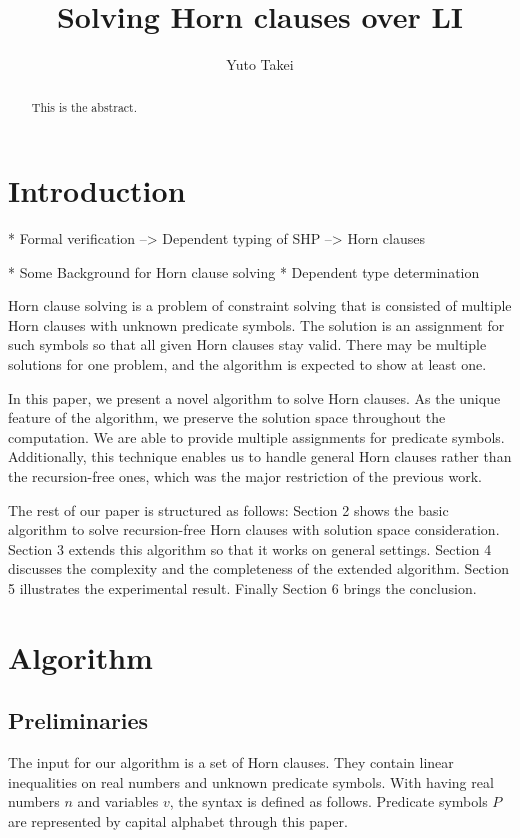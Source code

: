 \documentclass{llncs}
\title{Solving Horn clauses over LI}
\author{Yuto Takei}
\institute{The University of Tokyo}
\begin{document}
\maketitle
\begin{abstract}
  This is the abstract.
\end{abstract}

\section{Introduction}


* Formal verification
--> Dependent typing of SHP
--> Horn clauses

* Some
Background for Horn clause solving
* Dependent type determination

Horn clause solving is a problem of constraint solving that is consisted of multiple Horn clauses with unknown predicate symbols. The solution is an assignment for such symbols so that all given Horn clauses stay valid. There may be multiple solutions for one problem, and the algorithm is expected to show at least one.

In this paper, we present a novel algorithm to solve Horn clauses. As the unique feature of the algorithm, we preserve the solution space throughout the computation. We are able to provide multiple assignments for predicate symbols. Additionally, this technique enables us to handle general Horn clauses rather than the recursion-free ones, which was the major restriction of the previous work.

The rest of our paper is structured as follows: Section 2 shows the basic algorithm to solve recursion-free Horn clauses with solution space consideration. Section 3 extends this algorithm so that it works on general settings. Section 4 discusses the complexity and the completeness of the extended algorithm. Section 5 illustrates the experimental result. Finally Section 6 brings the conclusion.

\section{Algorithm}

\subsection{Preliminaries}

The input for our algorithm is a set of Horn clauses. They contain linear inequalities on real numbers and unknown predicate symbols. With having real numbers $n$ and variables $v$, the syntax is defined as follows. Predicate symbols $P$ are represented by capital alphabet through this paper.
\end{document}
